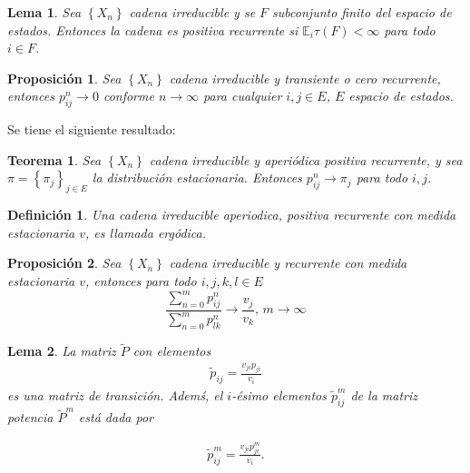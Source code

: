 \documentclass{article}
\newtheorem{Def}{Definición}[section]
\newtheorem{Teo}{Teorema}[section]
\newtheorem{Prop}{Proposición}[section]
\newtheorem{Lema}{Lema}[section]
\newcommand{\esp}{\mathbb{E}}
\numberwithin{equation}{section}
\begin{document}
\begin{Lema}
Sea $\left\{X_{n}\right\}$ cadena irreducible y se $F$ subconjunto finito del espacio de estados. Entonces la cadena es positiva recurrente si $\esp_{i}\tau\left(F\right)<\infty$ para todo $i\in F$.
\end{Lema}

\begin{Prop}
Sea $\left\{X_{n}\right\}$ cadena irreducible y transiente o cero recurrente, entonces $p_{ij}^{n}\rightarrow0$ conforme $n\rightarrow\infty$ para cualquier $i,j\in E$, $E$ espacio de estados.
\end{Prop}

Se tiene el siguiente resultado:

\begin{Teo}
Sea $\left\{X_{n}\right\}$ cadena irreducible y aperi\'odica positiva recurrente, y sea $\pi=\left\{\pi_{j}\right\}_{j\in E}$ la distribuci\'on estacionaria. Entonces $p_{ij}^{n}\rightarrow\pi_{j}$ para todo $i,j$.
\end{Teo}

\begin{Def}\label{Def.Ergodicidad}
Una cadena irreducible aperiodica, positiva recurrente con medida estacionaria $v$, es llamada {\em erg\'odica}.
\end{Def}

\begin{Prop}\label{Prop.4.4}
Sea $\left\{X_{n}\right\}$ cadena irreducible y recurrente con medida estacionaria $v$, entonces para todo $i,j,k,l\in E$
\begin{equation}
\frac{\sum_{n=0}^{m}p_{ij}^{n}}{\sum_{n=0}^{m}p_{lk}^{n}}\rightarrow\frac{v_{j}}{v_{k}}\textrm{,    }m\rightarrow\infty
\end{equation}
\end{Prop}

\begin{Lema}\label{Lema.4.5}
La matriz $\widetilde{P}$ con elementos 
\begin{eqnarray}
\widetilde{p}_{ij}=\frac{v_{ji}p_{ji}}{v_{i}}
\end{eqnarray}
es una matriz de transici\'on. Adem\'s, el $i$-\'esimo elementos $\widetilde{p}_{ij}^{m}$ de la matriz potencia $\widetilde{P}^{m}$ est\'a dada por 

\begin{eqnarray}
\widetilde{p}_{ij}^{m}=\frac{v_{ji}p_{ji}^{m}}{v_{i}}.
\end{eqnarray}
\end{Lema}
\end{document}

